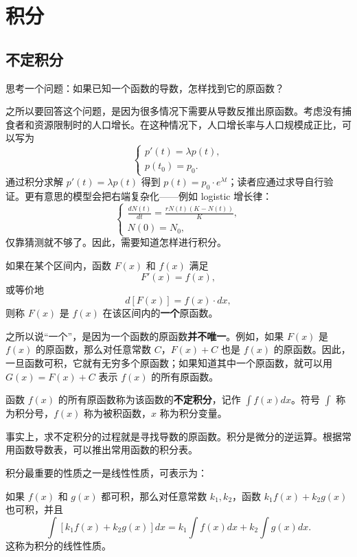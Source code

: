 \section{积分}

\subsection{不定积分}
思考一个问题：如果已知一个函数的导数，怎样找到它的原函数？

之所以要回答这个问题，是因为很多情况下需要从导数反推出原函数。考虑没有捕食者和资源限制时的人口增长。在这种情况下，人口增长率与人口规模成正比，可以写为
\[
\begin{cases}
p'(t)=\lambda p(t),\\
p(t_0)=p_0.
\end{cases}
\]
通过积分求解 $p'(t)=\lambda p(t)$ 得到 $p(t)=p_0\cdot e^{\lambda t}$；读者应通过求导自行验证。更有意思的模型会把右端复杂化——例如 logistic 增长律：
\[
\begin{cases}
\frac{dN(t)}{dt}=\frac{rN(t)(K-N(t))}{K},\\
N(0)=N_0,
\end{cases}
\]
仅靠猜测就不够了。因此，需要知道怎样进行积分。

\begin{definition}
如果在某个区间内，函数 $F(x)$ 和 $f(x)$ 满足
\[
F'(x)=f(x),
\]
或等价地
\[
d[F(x)]=f(x)\cdot dx,
\]
则称 $F(x)$ 是 $f(x)$ 在该区间内的\textbf{一个}原函数。
\end{definition}

之所以说“一个”，是因为一个函数的原函数\textbf{并不唯一}。例如，如果 $F(x)$ 是 $f(x)$ 的原函数，那么对任意常数 $C$，$F(x)+C$ 也是 $f(x)$ 的原函数。因此，一旦函数可积，它就有无穷多个原函数；如果知道其中一个原函数，就可以用 $G(x)=F(x)+C$ 表示 $f(x)$ 的所有原函数。

\begin{definition}
函数 $f(x)$ 的所有原函数称为该函数的\textbf{不定积分}，记作 $\int f(x)dx$。符号 $\int$ 称为积分号，$f(x)$ 称为被积函数，$x$ 称为积分变量。
\end{definition}

事实上，求不定积分的过程就是寻找导数的原函数。积分是微分的逆运算。根据常用函数导数表，可以推出常用函数的积分表。

积分最重要的性质之一是线性性质，可表示为：
\begin{theorem}
如果 $f(x)$ 和 $g(x)$ 都可积，那么对任意常数 $k_1,k_2$，函数 $k_1f(x)+k_2g(x)$ 也可积，并且
\[
\int [k_1f(x)+k_2g(x)]dx=k_1\int f(x)dx+k_2\int g(x)dx.
\]
这称为积分的线性性质。
\end{theorem}

